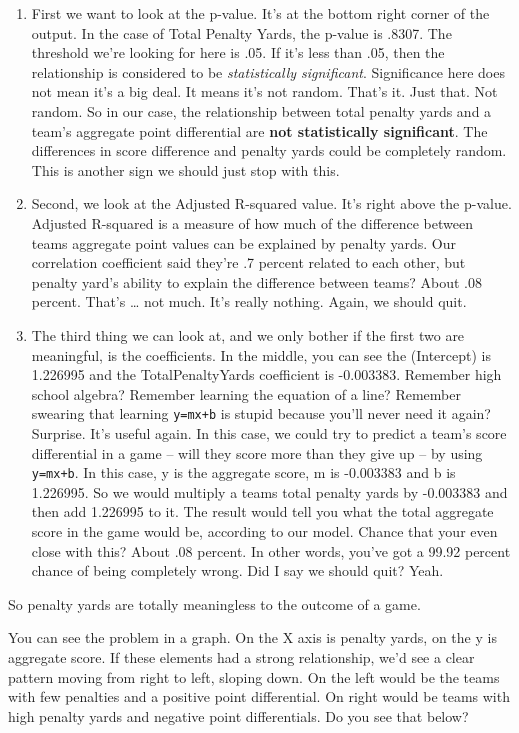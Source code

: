 \documentclass[
]{book}
\providecommand{\tightlist}{%
  \setlength{\itemsep}{0pt}\setlength{\parskip}{0pt}}
\begin{document}
\begin{enumerate}
\def\labelenumi{\arabic{enumi}.}
\tightlist
\item
  First we want to look at the p-value. It's at the bottom right corner of the output. In the case of Total Penalty Yards, the p-value is .8307. The threshold we're looking for here is .05. If it's less than .05, then the relationship is considered to be \emph{statistically significant}. Significance here does not mean it's a big deal. It means it's not random. That's it. Just that. Not random. So in our case, the relationship between total penalty yards and a team's aggregate point differential are \textbf{not statistically significant}. The differences in score difference and penalty yards could be completely random. This is another sign we should just stop with this.
\item
  Second, we look at the Adjusted R-squared value. It's right above the p-value. Adjusted R-squared is a measure of how much of the difference between teams aggregate point values can be explained by penalty yards. Our correlation coefficient said they're .7 percent related to each other, but penalty yard's ability to explain the difference between teams? About .08 percent. That's \ldots{} not much. It's really nothing. Again, we should quit.
\item
  The third thing we can look at, and we only bother if the first two are meaningful, is the coefficients. In the middle, you can see the (Intercept) is 1.226995 and the TotalPenaltyYards coefficient is -0.003383. Remember high school algebra? Remember learning the equation of a line? Remember swearing that learning \texttt{y=mx+b} is stupid because you'll never need it again? Surprise. It's useful again. In this case, we could try to predict a team's score differential in a game -- will they score more than they give up -- by using \texttt{y=mx+b}. In this case, y is the aggregate score, m is -0.003383 and b is 1.226995. So we would multiply a teams total penalty yards by -0.003383 and then add 1.226995 to it. The result would tell you what the total aggregate score in the game would be, according to our model. Chance that your even close with this? About .08 percent. In other words, you've got a 99.92 percent chance of being completely wrong. Did I say we should quit? Yeah.
\end{enumerate}

So penalty yards are totally meaningless to the outcome of a game.

You can see the problem in a graph. On the X axis is penalty yards, on the y is aggregate score. If these elements had a strong relationship, we'd see a clear pattern moving from right to left, sloping down. On the left would be the teams with few penalties and a positive point differential. On right would be teams with high penalty yards and negative point differentials. Do you see that below?
\end{document}
